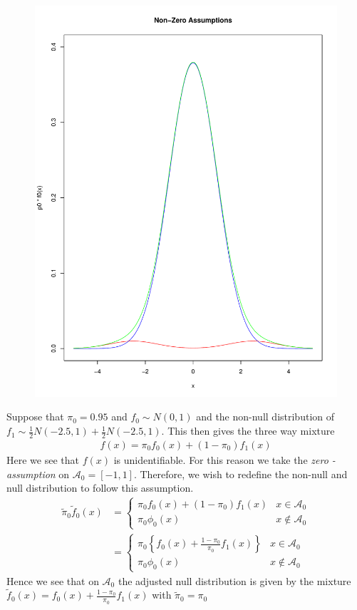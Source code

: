\documentclass[11pt]{article}
\begin{document}
\begin{figure}
	\centering
	\includegraphics[scale = 0.25]{figures/non_null.pdf}
\end{figure}
Suppose that $\pi_0 = 0.95$ and $f_0\sim N(0,1)$ and the non-null distribution of $f_1 \sim \frac{1}{2}N(-2.5,1)+\frac{1}{2}N(-2.5,1)$. This then gives the three way mixture 
\begin{align*}
f(x) = \pi_0f_0(x) + (1-\pi_0)f_1(x) 
\end{align*}
Here we see that $f(x)$ is unidentifiable. For this reason we take the \textit{zero - assumption} on $\mathcal{A}_0 = [-1,1]$. Therefore, we wish to redefine the non-null and null distribution to follow this assumption. 
\begin{align*}
\widetilde{\pi}_0\widetilde{f}_0(x) &= \begin{cases}
		\pi_0f_0(x) + (1-\pi_0)f_1(x) & x\in\mathcal{A}_0\\
		\pi_0\phi_0(x) & x\not\in\mathcal{A}_0
	\end{cases}\\
	&= \begin{cases}
		\pi_0\left\{f_0(x) + \frac{1-\pi_0}{\pi_0}f_1(x)\right\}& x\in\mathcal{A}_0\\
		\pi_0\phi_0(x) & x\not\in\mathcal{A}_0
	\end{cases}
\end{align*}
Hence we see that on $\mathcal{A}_0$ the adjusted null distribution is given by the mixture $\widetilde{f}_0(x) = f_0(x) +\frac{1-\pi_0}{\pi_0}f_1(x)$ with $\widetilde{\pi}_0 = \pi_0$
\end{document}

